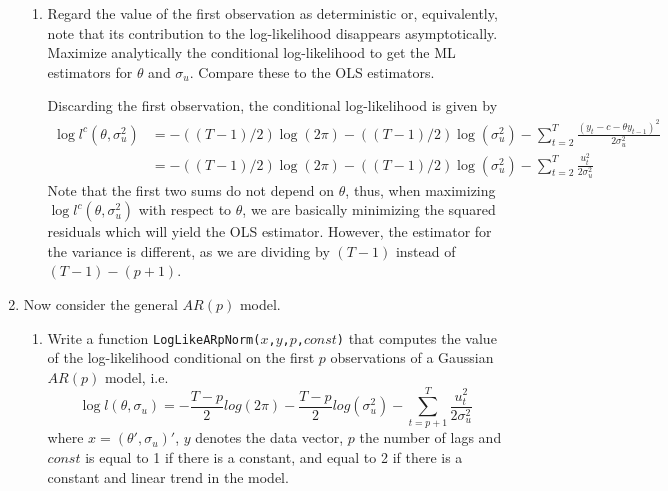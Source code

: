 \documentclass[a4paper]{scrartcl}
\begin{document}
\begin{enumerate}
\begin{enumerate}
                  \item Regard the value of the first observation as deterministic or, equivalently, note that its contribution to the log-likelihood disappears asymptotically. Maximize analytically the conditional log-likelihood to get the ML estimators for $\theta$ and $\sigma_u$. Compare these to the OLS estimators.
                        \begin{solution}
                            Discarding the first observation, the conditional log-likelihood is given by
                            \begin{align*}
                                \log l^c(\theta,\sigma_u^2) & = -((T-1)/2)\log(2\pi)-((T-1)/2)\log(\sigma^2_u)-\sum_{t=2}^{T}\frac{(y_t-c-\theta y_{t-1})^2}{2\sigma_u^2} \\
                                                            & = -((T-1)/2)\log(2\pi)-((T-1)/2)\log(\sigma^2_u)-\sum_{t=2}^{T}\frac{u_t^2}{2\sigma_u^2}
                            \end{align*}
                            Note that the first two sums do not depend on $\theta$, thus, when maximizing $\log l^c(\theta,\sigma_u^2)$ with respect to $\theta$, we are basically minimizing the squared residuals which will yield the OLS estimator. However, the estimator for the variance is different, as we are dividing by $(T-1)$ instead of $(T-1)-(p+1)$.
                        \end{solution}
              \end{enumerate}
        \item Now consider the general $AR(p)$ model.
              \begin{enumerate}
                  \item Write a function \texttt{LogLikeARpNorm($x$,$y$,$p$,$const$)} that computes the value of the log-likelihood conditional on the first $p$ observations of a Gaussian $AR(p)$ model, i.e.
                        $$ \log l(\theta,\sigma_u)= -\frac{T-p}{2}log(2\pi)-\frac{T-p}{2}log(\sigma_u^2)-\sum_{t=p+1}^{T}\frac{u_t^2}{2\sigma_u^2}$$
                        where $x=(\theta',\sigma_u)'$, $y$ denotes the data vector, $p$ the number of lags and $const$ is equal to 1 if there is a constant, and equal to 2 if there is a constant and linear trend in the model.
                        \begin{solution}~
                            
                        \end{solution}

\end{enumerate}
\end{enumerate}
\end{document}
